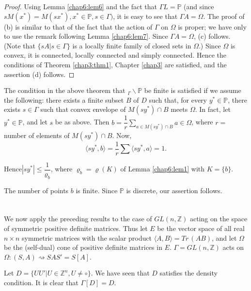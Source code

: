\begin{proof}
  Using Lemma \ref{chap6:lem6} and the fact that $\Gamma L = \mathbb{P}$ (and since
  $sM(x^*)=M(sx^*), x^* \in \mathbb{P}, s \in \Gamma)$, it is easy to
  see that $\Gamma A = \Omega$. The proof of (b) is similar to that of
  the fact that the action of $\Gamma$ on $\Omega$ is proper; we have
  only to use the remark following Lemma \ref{chap6:lem7}. Since $
  \Gamma A = \Omega$, 
  (c) follows. (Note that $\bigg\{sA | s \in \Gamma \bigg\}$ is a
  locally finite family of closed sets in $\Omega$.) Since $\Omega$ is
  convex, it is connected, locally connected and simply connected. Hence
  the conditions of Theorem \ref{chap3:thm1}, Chapter \ref{chap3} are
  satisfied, and the   assertion (d) follows.  
\end{proof}

\begin{remark*}
  The condition in the above theorem that $_\Gamma\backslash\mathbb{P}$
  be finite is satisfied if we assume the following: there exists a
  finite subset $B$ of $D$ such that, for every $y^* \in \mathbb{P}$,
  there exists $s \in \Gamma$ such that convex envelope of $M(sy^*)\cap
  B$ meets $\Omega$. In fact, let $y^* \in \mathbb{P}$, and let $s$ be
  as above. Then $b = \dfrac{1}{r} \sum \limits_{ a \in M(sy^*) \cap B}
  a \in \Omega$, where $r=$number of elements of $M(sy^*)\cap B$. Now, 
  $$
  \langle sy^*,b \rangle = \frac{1}{r} \sum \langle sy^*,a\rangle =1.
  $$
\end{remark*}

Hence\pageoriginale $|sy^*| \leq \dfrac{1}{\varrho_b}$, where $\varrho_b =
\varrho(K)$ of Lemma \ref{chap6:lem1} with $K= \{b\}$. 

The number of points $b$ is finite. Since $\mathbb{P}$ is discrete,
our assertion follows. 

\section{}%

We now apply the preceding  results to the case of $GL(n, \mathbb{Z})$
acting on the space of symmetric positive definite matrices. Thus let
$E$ be the vector space of all real $n \times n$ symmetric matrices
with the scalar product $\langle A,B \rangle = Tr \,(AB)$, and let
$\Omega$ be the (self-dual) cone of positive definite matrices in
$E$. $\Gamma =GL(n,\mathbb{Z})$ acts on $\Omega : (S,A)\rightsquigarrow
SAS' =S[A]$. 

Let $D=\bigg\{UU'|U \in \mathbb{Z}^n,U \neq \circ \bigg\}$. We have seen
that $D$ satisfies the density condition. It is clear that $\Gamma
[D]=D$. 

